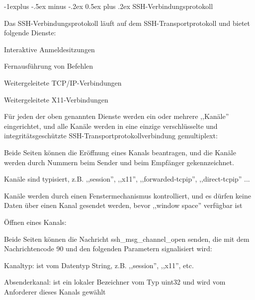 \documentclass[a4paper]{article}
\makeatletter
\renewcommand{\subsection}{\@startsection{subsection}{2}{0mm}%
 {-1explus -.5ex minus -.2ex}%
 {0.5ex plus .2ex}%
 {\normalfont\normalsize\bfseries}}
\makeatother
\begin{document}
\begin{multicols}{3}
      \subsection{SSH-Verbindungsprotokoll}
      \begin{itemize*}
            \item Das SSH-Verbindungsprotokoll läuft auf dem SSH-Transportprotokoll und bietet folgende Dienste:
            \begin{itemize*}
                  \item Interaktive Anmeldesitzungen
                  \item Fernausführung von Befehlen
                  \item Weitergeleitete TCP/IP-Verbindungen
                  \item Weitergeleitete X11-Verbindungen
            \end{itemize*}
            \item Für jeden der oben genannten Dienste werden ein oder mehrere ,,Kanäle'' eingerichtet, und alle Kanäle werden in eine einzige verschlüsselte und integritätsgeschützte SSH-Transportprotokollverbindung gemultiplext:
            \begin{itemize*}
                  \item Beide Seiten können die Eröffnung eines Kanals beantragen, und die Kanäle werden durch Nummern beim Sender und beim Empfänger gekennzeichnet.
                  \item Kanäle sind typisiert, z.B. ,,session'', ,,x11'', ,,forwarded-tcpip'', ,,direct-tcpip'' ...
                  \item Kanäle werden durch einen Fenstermechanismus kontrolliert, und es dürfen keine Daten über einen Kanal gesendet werden, bevor ,,window space'' verfügbar ist
            \end{itemize*}
            \item Öffnen eines Kanals:
            \begin{itemize*}
                  \item Beide Seiten können die Nachricht ssh\_msg\_channel\_open senden, die mit dem Nachrichtencode 90 und den folgenden Parametern signalisiert wird:
                  \begin{itemize*}
                        \item Kanaltyp: ist vom Datentyp String, z.B. ,,session'', ,,x11'', etc.
                        \item Absenderkanal: ist ein lokaler Bezeichner vom Typ uint32 und wird vom Anforderer dieses Kanals gewählt

\end{itemize*}
\end{itemize*}
\end{itemize*}
\end{multicols}
\end{document}

